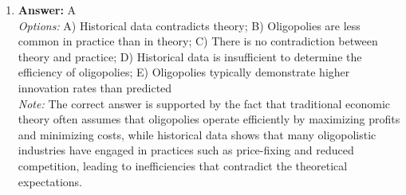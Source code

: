 \documentclass[12pt]{article}
\begin{document}
\begin{enumerate}[label=\arabic*.]
\\ \textit{Options:} A) increase long-run output with no significant impact on inflation.; B) have no significant impact on either output or inflation.; C) lower the unemployment rate while also lowering the rate of inflation.; D) increase short-run output but it is the source of long-run inflation.; E) increase the nation's long-run capacity to produce.
\\ \textit{Note:} The quantity theory of money posits that while an increase in the money supply can temporarily boost short-run output by stimulating demand, it ultimately leads to higher prices and inflation in the long run as the economy adjusts to the increased monetary base without a corresponding increase in real output.
\item \textbf{Answer:} A
\\ \textit{Options:} A) Historical data contradicts theory; B) Oligopolies are less common in practice than in theory; C) There is no contradiction between theory and practice; D) Historical data is insufficient to determine the efficiency of oligopolies; E) Oligopolies typically demonstrate higher innovation rates than predicted
\\ \textit{Note:} The correct answer is supported by the fact that traditional economic theory often assumes that oligopolies operate efficiently by maximizing profits and minimizing costs, while historical data shows that many oligopolistic industries have engaged in practices such as price-fixing and reduced competition, leading to inefficiencies that contradict the theoretical expectations.
\end{enumerate}
\end{document}
